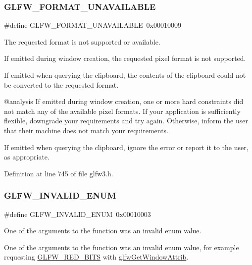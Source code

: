 \subsubsection{\texorpdfstring{GLFW\_FORMAT\_UNAVAILABLE}{GLFW\_FORMAT\_UNAVAILABLE}}
{\footnotesize\ttfamily \#define G\+L\+F\+W\+\_\+\+F\+O\+R\+M\+A\+T\+\_\+\+U\+N\+A\+V\+A\+I\+L\+A\+B\+LE~0x00010009}



The requested format is not supported or available. 

If emitted during window creation, the requested pixel format is not supported.

If emitted when querying the clipboard, the contents of the clipboard could not be converted to the requested format.

@analysis If emitted during window creation, one or more hard constraints did not match any of the available pixel formats. If your application is sufficiently flexible, downgrade your requirements and try again. Otherwise, inform the user that their machine does not match your requirements.

\begin{DoxyParagraph}{}
If emitted when querying the clipboard, ignore the error or report it to the user, as appropriate. 
\end{DoxyParagraph}


Definition at line 745 of file glfw3.\+h.

\mbox{\label{group__errors_ga76f6bb9c4eea73db675f096b404593ce}} 
\subsubsection{\texorpdfstring{GLFW\_INVALID\_ENUM}{GLFW\_INVALID\_ENUM}}
{\footnotesize\ttfamily \#define G\+L\+F\+W\+\_\+\+I\+N\+V\+A\+L\+I\+D\+\_\+\+E\+N\+UM~0x00010003}



One of the arguments to the function was an invalid enum value. 

One of the arguments to the function was an invalid enum value, for example requesting \mbox{\hyperlink{group__window_gaf78ed8e417dbcc1e354906cc2708c982}{G\+L\+F\+W\+\_\+\+R\+E\+D\+\_\+\+B\+I\+TS}} with \mbox{\hyperlink{group__window_ga1bb0c7e100418e284dbb800789c63d40}{glfw\+Get\+Window\+Attrib}}.

